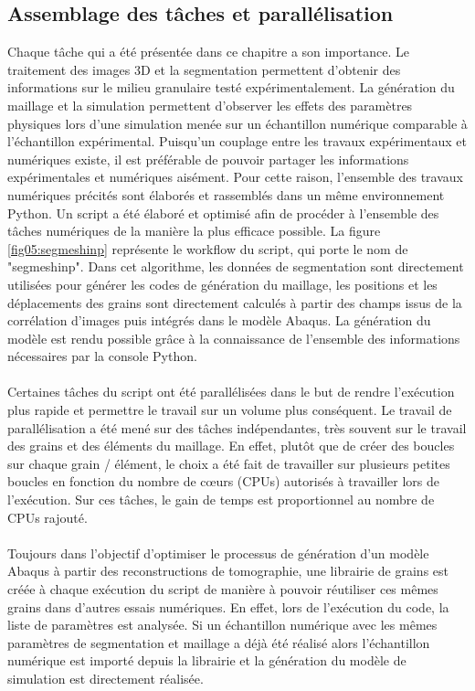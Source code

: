 	\subsection{Assemblage des tâches et parallélisation}
		Chaque tâche qui a été présentée dans ce chapitre a son importance. Le traitement des images 3D et la segmentation permettent d'obtenir des informations sur le milieu granulaire testé expérimentalement. La génération du maillage et la simulation permettent d'observer les effets des paramètres physiques lors d'une simulation menée sur un échantillon numérique comparable à l'échantillon expérimental. Puisqu'un couplage entre les travaux expérimentaux et numériques existe, il est préférable de pouvoir partager les informations expérimentales et numériques aisément. Pour cette raison, l'ensemble des travaux numériques précités sont élaborés et rassemblés dans un même environnement Python. Un script a été élaboré et optimisé afin de procéder à l'ensemble des tâches numériques de la manière la plus efficace possible. La figure \ref{fig05:segmeshinp} représente le workflow du script, qui porte le nom de "segmeshinp". Dans cet algorithme, les données de segmentation sont directement utilisées pour générer les codes de génération du maillage, les positions et les déplacements des grains sont directement calculés à partir des champs issus de la corrélation d'images puis intégrés dans le modèle Abaqus. La génération du modèle est rendu possible grâce à la connaissance de l'ensemble des informations nécessaires par la console Python.
		\paragraph{}Certaines tâches du script ont été parallélisées dans le but de rendre l'exécution plus rapide et permettre le travail sur un volume plus conséquent. Le travail de parallélisation a été mené sur des tâches indépendantes, très souvent sur le travail des grains et des éléments du maillage. En effet, plutôt que de créer des boucles sur chaque grain / élément, le choix a été fait de travailler sur plusieurs petites boucles en fonction du nombre de c\oe{}urs (CPUs) autorisés à travailler lors de l'exécution. Sur ces tâches, le gain de temps est proportionnel au nombre de CPUs rajouté.
		\paragraph{}Toujours dans l'objectif d'optimiser le processus de génération d'un modèle Abaqus à partir des reconstructions de tomographie, une librairie de grains est créée à chaque exécution du script de manière à pouvoir réutiliser ces mêmes grains dans d'autres essais numériques. En effet, lors de l'exécution du code, la liste de paramètres est analysée. Si un échantillon numérique avec les mêmes paramètres de segmentation et maillage a déjà été réalisé alors l'échantillon numérique est importé depuis la librairie et la génération du modèle de simulation est directement réalisée.

